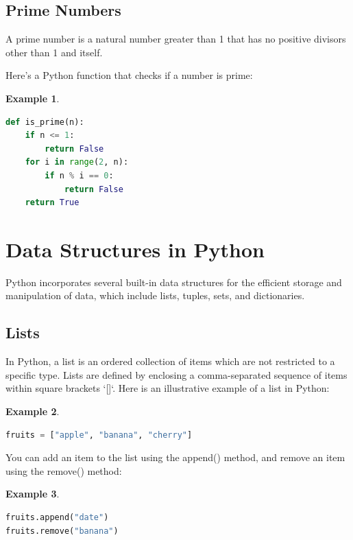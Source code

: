 \documentclass[12pt]{article}
\newtheorem{Example}{Example}[section]
\begin{document}
\subsection{Prime Numbers}
A prime number is a natural number greater than 1 that has no positive divisors other than 1 and itself.


Here's a Python function that checks if a number is prime:
\begin{Example}
\begin{lstlisting}[language=Python]
def is_prime(n):
    if n <= 1:
        return False
    for i in range(2, n):
        if n % i == 0:
            return False
    return True
\end{lstlisting}
\end{Example}

\newpage
\section{Data Structures in Python}

Python incorporates several built-in data structures for the efficient storage and manipulation of data, which include lists, tuples, sets, and dictionaries.

\subsection{Lists}
In Python, a list is an ordered collection of items which are not restricted to a specific type. Lists are defined by enclosing a comma-separated sequence of items within square brackets `[]`. Here is an illustrative example of a list in Python:
\begin{Example}
\begin{lstlisting}[language=Python]
fruits = ["apple", "banana", "cherry"]
\end{lstlisting}
\end{Example}
You can add an item to the list using the append() method, and remove an item using the remove() method:
\begin{Example}
\begin{lstlisting}[language=Python]
fruits.append("date")
fruits.remove("banana")
\end{lstlisting}
\end{Example}
\end{document}
